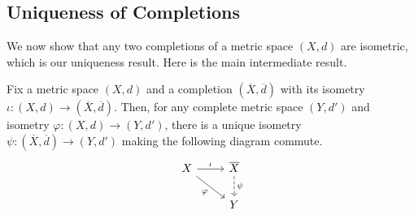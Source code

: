 \documentclass[../notes.tex]{subfiles}
\begin{document}
\subsection{Uniqueness of Completions}
We now show that any two completions of a metric space $(X,d)$ are isometric, which is our uniqueness result. Here is the main intermediate result.
\begin{lemma} \label{lem:completionup}
	Fix a metric space $(X,d)$ and a completion $(\overline X,\overline d)$ with its isometry $\iota\colon(X,d)\to(\overline X,\overline d)$. Then, for any complete metric space $(Y,d')$ and isometry $\varphi\colon(X,d)\to(Y,d')$, there is a unique isometry $\psi\colon(\overline X,\overline d)\to(Y,d')$ making the following diagram commute.
	\[\begin{tikzcd}
		X & {\overline X} \\
		& Y
		\arrow["\iota", from=1-1, to=1-2]
		\arrow["\varphi"', from=1-1, to=2-2]
		\arrow["\psi", dashed, from=1-2, to=2-2]
	\end{tikzcd}\]
\end{lemma}
\end{document}
